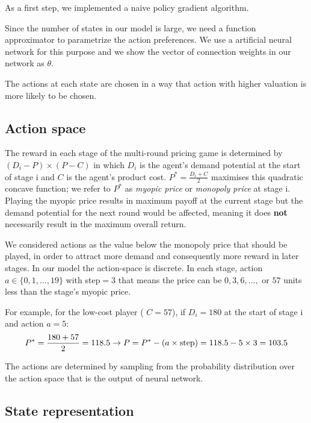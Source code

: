 \documentclass[a4paper,12pt]{article}  %
\theoremstyle{definition}
\begin{document}
	As a first step, we implemented a naive policy gradient algorithm.  
	
	
	Since the number of states in our model is large, we need a function approximator to parametrize the action preferences. We use a artificial neural network for this purpose and we show the vector of connection weights in our network as $ \theta $.
	
	The actions at each state are chosen in a way that action with higher valuation is more likely to be chosen. 
	
	\subsection{Action space} 
	
	The reward in each stage of the multi-round pricing game is determined by $ (D_i-P)\times(P-C) $ in which $ D_i $ is the agent's demand potential at the start of stage i and $ C $ is the agent's product cost. $ P^* = \frac{D_i + C}{2} $ maximises this quadratic concave function; we refer to $ P^* $ as \textit{myopic price} or \textit{monopoly price} at stage i. Playing the myopic price results in maximum payoff at the current stage but the demand potential for the next round would be affected, meaning it does\textbf{ not} necessarily result in the maximum overall return.
	
	We considered actions as the value below the monopoly price that should be played, in order to attract more demand and consequently more reward in later stages. In our model the action-space is discrete. In each stage, action $ a \in \lbrace0, 1, ..., 19\rbrace $ with step$ =3 $ that means the price can be $ 0, 3, 6, ... ,$ or $57 $ units less than the stage's myopic price. 
	
	For example, for the low-cost player ( $ C=57 $), if $ D_i = 180 $ at the start of stage i and action $ a = 5 $:
	\begin{equation*}
		P^* = \frac{180 + 57}{2} = 118.5  \rightarrow P = P^*- ( a\times \text{step}) = 118.5 - 5\times 3 = 103.5 \\
	\end{equation*}

	The actions are determined by sampling from the probability distribution over the action space that is the output of neural network.
	
	\subsection{State representation}
	
\end{document}
